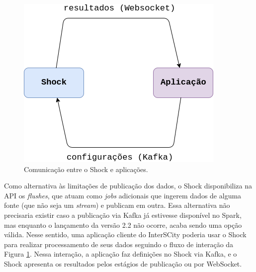 \begin{figure}[hbt]
  \centering
    \includegraphics[scale=0.5]{figuras/ligacoes.png}
  \caption{Comunicação entre o Shock e aplicações.}
  \label{fig:ligacoes}
\end{figure}

Como alternativa às limitações de publicação dos dados, o Shock
disponibiliza na API os \textit{flushes}, que atuam como \textit{jobs} adicionais
que ingerem dados de alguma fonte (que não seja um \textit{stream}) e publicam
em outra. Essa alternativa não precisaria existir caso a publicação via Kafka
já estivesse disponível no Spark, mas enquanto o lançamento da versão 2.2 não
ocorre, acaba sendo uma opção válida. Nesse sentido, uma aplicação cliente do
InterSCity poderia usar o Shock para realizar processamento de seus dados
seguindo o fluxo de interação da Figura \ref{fig:ligacoes}. Nessa interação, a
aplicação faz definições no Shock via Kafka, e o Shock apresenta os resultados
pelos estágios de publicação ou por WebSocket.
